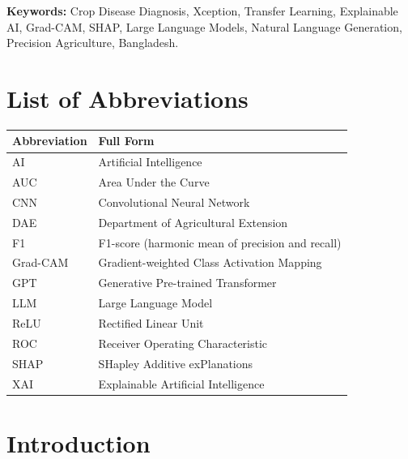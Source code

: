\documentclass[12pt,a4paper,oneside]{report}
\begin{document}
\vspace{0.5cm}
\noindent\textbf{Keywords:} Crop Disease Diagnosis, Xception, Transfer Learning, Explainable AI, Grad-CAM, SHAP,
Large Language Models, Natural Language Generation, Precision Agriculture, Bangladesh.

\tableofcontents
\listoffigures
\listoftables

\chapter*{List of Abbreviations}
\begin{table}[H]
\centering
\begin{tabular}{ll}
\toprule
\textbf{Abbreviation} & \textbf{Full Form} \\
\midrule
AI & Artificial Intelligence \\
AUC & Area Under the Curve \\
CNN & Convolutional Neural Network \\
DAE & Department of Agricultural Extension \\
F1 & F1-score (harmonic mean of precision and recall) \\
Grad-CAM & Gradient-weighted Class Activation Mapping \\
GPT & Generative Pre-trained Transformer \\
LLM & Large Language Model \\
ReLU & Rectified Linear Unit \\
ROC & Receiver Operating Characteristic \\
SHAP & SHapley Additive exPlanations \\
XAI & Explainable Artificial Intelligence \\
\bottomrule
\end{tabular}
\end{table}

\chapter{Introduction}
\label{ch:introduction}
\end{document}
